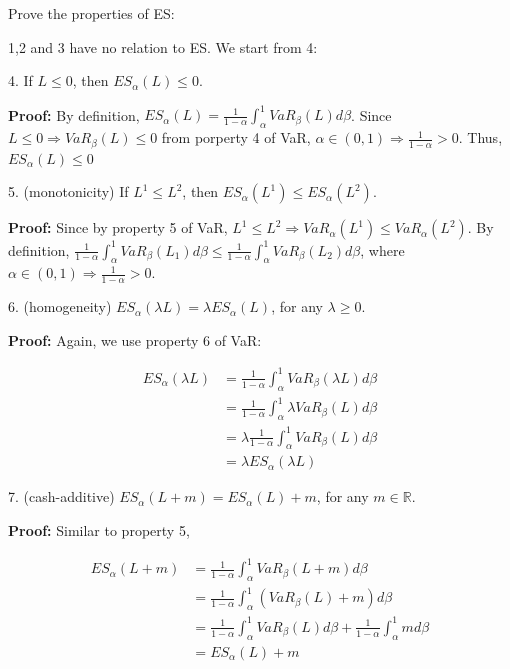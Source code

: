 \documentclass[letterpaper,11pt]{article}
\begin{document}
\begin{spacing}{1.2}
Prove the properties of ES:

1,2 and 3 have no relation to ES. We start from 4:

4. If $L \le 0$, then $ES_{\alpha}(L) \le 0$.

\textbf{Proof:} By definition, $ES_{\alpha}(L) = \frac{1}{1-\alpha} \int_{\alpha}^1 VaR_{\beta}(L) d\beta$. Since $L \le 0 \Rightarrow VaR_{\beta}(L) \le 0$ from porperty 4 of VaR, $\alpha \in (0,1) \Rightarrow \frac{1}{1-\alpha} > 0$. Thus, $ES_{\alpha}(L) \le 0$

5. (monotonicity) If $L^1 \le L^2$, then $ES_{\alpha}(L^1) \le ES_{\alpha} (L^2)$.

\textbf{Proof:} Since by property 5 of VaR, $L^1 \le L^2 \Rightarrow VaR_{\alpha}(L^1) \le VaR_{\alpha} (L^2)$. By definition, $\frac{1}{1-\alpha} \int_{\alpha}^1 VaR_{\beta}(L_1) d\beta \le \frac{1}{1-\alpha} \int_{\alpha}^1 VaR_{\beta}(L_2) d\beta$, where $\alpha \in (0,1) \Rightarrow \frac{1}{1-\alpha} > 0$.

6. (homogeneity) $ES_{\alpha}(\lambda L) = \lambda ES_{\alpha}(L)$, for any $\lambda \ge 0$.

\textbf{Proof:} Again, we use property 6 of VaR:

\begin{equation}
\begin{aligned}
ES_{\alpha}(\lambda L) &= \frac{1}{1-\alpha} \int_{\alpha}^1 VaR_{\beta}(\lambda L) d\beta \\
&= \frac{1}{1-\alpha} \int_{\alpha}^1 \lambda VaR_{\beta}(L) d\beta \\
&= \lambda \frac{1}{1-\alpha} \int_{\alpha}^1 VaR_{\beta}(L) d\beta \\
&= \lambda ES_{\alpha}(\lambda L)
\end{aligned}
\end{equation}

7. (cash-additive) $ES_{\alpha}(L+m) = ES_{\alpha}(L) + m$, for any $m \in \mathbb{R}$.

\textbf{Proof:} Similar to property 5,

\begin{equation}
\begin{aligned}
ES_{\alpha}(L + m) &= \frac{1}{1-\alpha} \int_{\alpha}^1 VaR_{\beta}(L+m) d\beta \\
&= \frac{1}{1-\alpha} \int_{\alpha}^1 (VaR_{\beta}(L) + m) d\beta \\
&= \frac{1}{1-\alpha} \int_{\alpha}^1 VaR_{\beta}(L) d\beta + \frac{1}{1-\alpha} \int_{\alpha}^1 m d\beta \\
&= ES_{\alpha}(L) + m
\end{aligned}
\end{equation}


\end{spacing}
\end{document}
